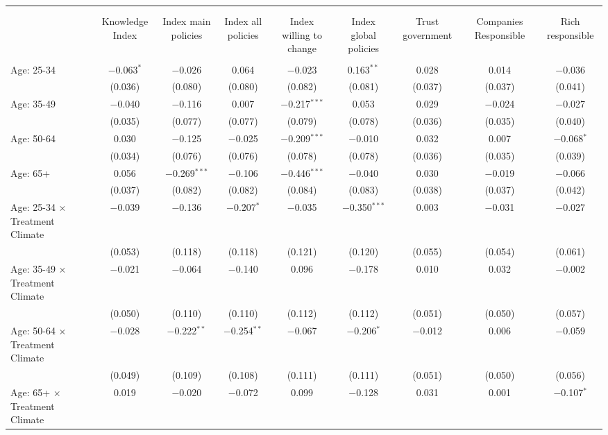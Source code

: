 
\begin{tabular}{@{\extracolsep{5pt}}lcccccccc} 
\\[-1.8ex]\hline 
\hline \\[-1.8ex] 
\\[-1.8ex] & Knowledge Index & Index main policies & Index all policies & Index willing to change & Index global policies & Trust government & Companies Responsible & Rich responsible \\ 
\hline \\[-1.8ex] 
 Age: 25-34 & $-$0.063$^{*}$ & $-$0.026 & 0.064 & $-$0.023 & 0.163$^{**}$ & 0.028 & 0.014 & $-$0.036 \\ 
  & (0.036) & (0.080) & (0.080) & (0.082) & (0.081) & (0.037) & (0.037) & (0.041) \\ 
 Age: 35-49 & $-$0.040 & $-$0.116 & 0.007 & $-$0.217$^{***}$ & 0.053 & 0.029 & $-$0.024 & $-$0.027 \\ 
  & (0.035) & (0.077) & (0.077) & (0.079) & (0.078) & (0.036) & (0.035) & (0.040) \\ 
 Age: 50-64 & 0.030 & $-$0.125 & $-$0.025 & $-$0.209$^{***}$ & $-$0.010 & 0.032 & 0.007 & $-$0.068$^{*}$ \\ 
  & (0.034) & (0.076) & (0.076) & (0.078) & (0.078) & (0.036) & (0.035) & (0.039) \\ 
 Age: 65+ & 0.056 & $-$0.269$^{***}$ & $-$0.106 & $-$0.446$^{***}$ & $-$0.040 & 0.030 & $-$0.019 & $-$0.066 \\ 
  & (0.037) & (0.082) & (0.082) & (0.084) & (0.083) & (0.038) & (0.037) & (0.042) \\ 
 Age: 25-34 $\times$ Treatment Climate & $-$0.039 & $-$0.136 & $-$0.207$^{*}$ & $-$0.035 & $-$0.350$^{***}$ & 0.003 & $-$0.031 & $-$0.027 \\ 
  & (0.053) & (0.118) & (0.118) & (0.121) & (0.120) & (0.055) & (0.054) & (0.061) \\ 
 Age: 35-49 $\times$ Treatment Climate & $-$0.021 & $-$0.064 & $-$0.140 & 0.096 & $-$0.178 & 0.010 & 0.032 & $-$0.002 \\ 
  & (0.050) & (0.110) & (0.110) & (0.112) & (0.112) & (0.051) & (0.050) & (0.057) \\ 
 Age: 50-64 $\times$ Treatment Climate & $-$0.028 & $-$0.222$^{**}$ & $-$0.254$^{**}$ & $-$0.067 & $-$0.206$^{*}$ & $-$0.012 & 0.006 & $-$0.059 \\ 
  & (0.049) & (0.109) & (0.108) & (0.111) & (0.111) & (0.051) & (0.050) & (0.056) \\ 
 Age: 65+ $\times$ Treatment Climate & 0.019 & $-$0.020 & $-$0.072 & 0.099 & $-$0.128 & 0.031 & 0.001 & $-$0.107$^{*}$ \\ 

\end{tabular}
